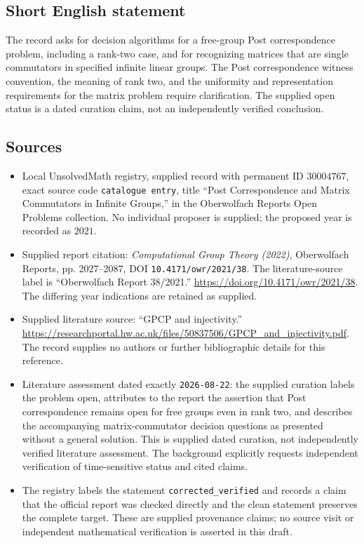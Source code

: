 \documentclass[11pt]{article}
\begin{document}
\subsection{Short English statement}
The record asks for decision algorithms for a free-group Post correspondence problem, including a rank-two case, and for recognizing matrices that are single commutators in specified infinite linear groups. The Post correspondence witness convention, the meaning of rank two, and the uniformity and representation requirements for the matrix problem require clarification. The supplied open status is a dated curation claim, not an independently verified conclusion.
\subsection{Sources}
\begin{itemize}
\item Local UnsolvedMath registry, supplied record with permanent ID \(30004767\), exact source code \texttt{catalogue entry}, title ``Post Correspondence and Matrix Commutators in Infinite Groups,'' in the Oberwolfach Reports Open Problems collection. No individual proposer is supplied; the proposed year is recorded as \(2021\).
\item Supplied report citation: \emph{Computational Group Theory (2022)}, Oberwolfach Reports, pp. 2027--2087, DOI \texttt{10.4171/owr/2021/38}. The literature-source label is ``Oberwolfach Report 38/2021.'' \url{https://doi.org/10.4171/owr/2021/38}. The differing year indications are retained as supplied.
\item Supplied literature source: ``GPCP and injectivity.'' \url{https://researchportal.hw.ac.uk/files/50837506/GPCP_and_injectivity.pdf}. The record supplies no authors or further bibliographic details for this reference.
\item Literature assessment dated exactly \texttt{2026-08-22}: the supplied curation labels the problem open, attributes to the report the assertion that Post correspondence remains open for free groups even in rank two, and describes the accompanying matrix-commutator decision questions as presented without a general solution. This is supplied dated curation, not independently verified literature assessment. The background explicitly requests independent verification of time-sensitive status and cited claims.
\item The registry labels the statement \texttt{corrected\_verified} and records a claim that the official report was checked directly and the clean statement preserves the complete target. These are supplied provenance claims; no source visit or independent mathematical verification is asserted in this draft.
\end{itemize}
\end{document}
